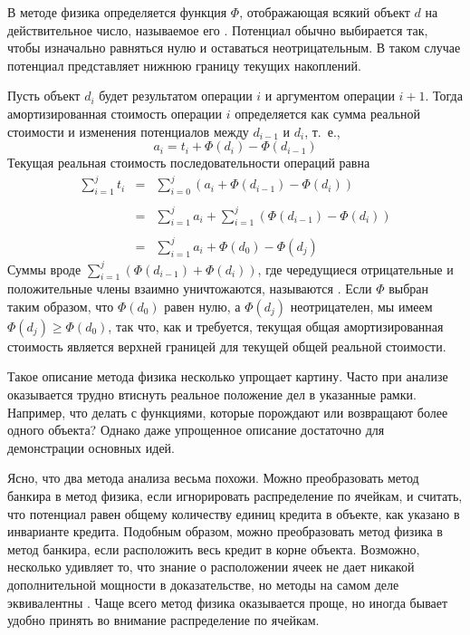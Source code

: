 В методе физика определяется функция $\Phi$, отображающая всякий
объект $d$ на действительное число, называемое его
.  Потенциал обычно выбирается так, чтобы
изначально равняться нулю и оставаться неотрицательным. В таком случае
потенциал представляет нижнюю границу текущих накоплений.

Пусть объект $d_i$ будет результатом операции $i$ и аргументом
операции $i+1$. Тогда амортизированная стоимость операции $i$
определяется как сумма реальной стоимости и изменения потенциалов между
$d_{i-1}$ и $d_i$, т.~е.,
$$
a_i = t_i + \Phi(d_i) - \Phi(d_{i-1})
$$
Текущая реальная стоимость последовательности операций равна
$$
\begin{array}{rcl}
\sum_{i=1}^j t_i & = & \sum_{i=0}^j (a_i + \Phi(d_{i-1}) - \Phi(d_i))\\
\\
  & = & \sum_{i=1}^j a_i + \sum_{i=1}^j (\Phi(d_{i-1}) - \Phi(d_i)) \\
\\
  & = & \sum_{i=1}^j a_i + \Phi(d_0) - \Phi(d_j)
\end{array}
$$
Суммы вроде $\sum_{i=1}^j (\Phi(d_{i-1}) + \Phi(d_i))$, где
чередущиеся отрицательные и положительные члены взаимно уничтожаются,
называются . Если $\Phi$ выбран таким образом, что
$\Phi(d_0)$ равен нулю, а $\Phi(d_j)$ неотрицателен, мы имеем
$\Phi(d_j) \ge \Phi(d_0)$, так что, как и требуется, текущая общая
амортизированная стоимость является верхней границей для текущей общей
реальной стоимости.

\begin{remark}
  Такое описание метода физика несколько упрощает
  картину. Часто при анализе оказывается трудно втиснуть реальное
  положение дел в указанные рамки. Например, что делать с функциями,
  которые порождают или возвращают более одного объекта? Однако даже
  упрощенное описание достаточно для демонстрации основных идей.
\end{remark}

Ясно, что два метода анализа весьма похожи. Можно преобразовать метод
банкира в метод физика, если игнорировать распределение по ячейкам, и
считать, что потенциал равен общему количеству единиц кредита в
объекте, как указано в инварианте кредита. Подобным образом, можно
преобразовать метод физика в метод банкира, если расположить весь
кредит в корне объекта. Возможно, несколько удивляет то, что знание о
расположении ячеек не дает никакой дополнительной мощности в
доказательстве, но методы на самом деле эквивалентны \cite{Tarjan1985,
  Schoenmakers1992}. Чаще всего метод физика оказывается проще, но
иногда бывает удобно принять во внимание распределение по ячейкам.

